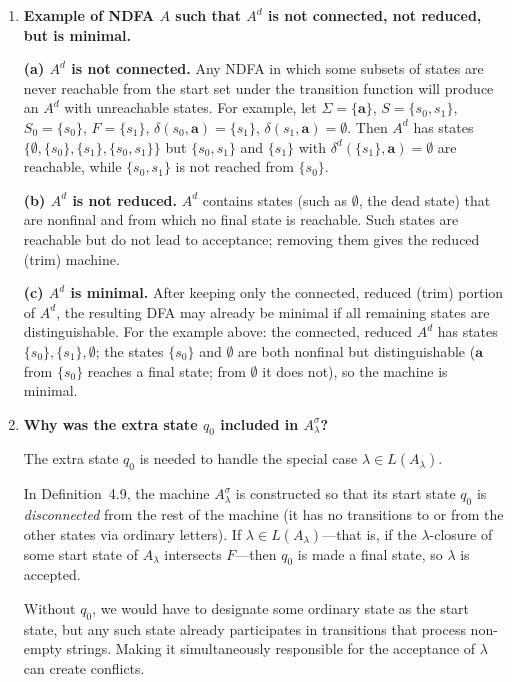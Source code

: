 \begin{enumerate}[{4.}1.]
\item \textbf{Example of NDFA $A$ such that $A^d$ is not connected, not reduced,
but is minimal.}

\textbf{(a) $A^d$ is not connected.}  Any NDFA in which some subsets of states
are never reachable from the start set under the transition function will
produce an $A^d$ with unreachable states.  For example, let
$\Sigma=\{\pmb{a}\}$, $S=\{s_0,s_1\}$, $S_0=\{s_0\}$, $F=\{s_1\}$,
$\delta(s_0,\pmb{a})=\{s_1\}$, $\delta(s_1,\pmb{a})=\emptyset$.
Then $A^d$ has states $\{\emptyset,\{s_0\},\{s_1\},\{s_0,s_1\}\}$ but
$\{s_0,s_1\}$ and $\{s_1\}$ with $\delta^d(\{s_1\},\pmb{a})=\emptyset$ are
reachable, while $\{s_0,s_1\}$ is not reached from $\{s_0\}$.

\textbf{(b) $A^d$ is not reduced.}  $A^d$ contains states (such as
$\emptyset$, the dead state) that are nonfinal and from which no final state is
reachable.  Such states are reachable but do not lead to acceptance; removing
them gives the reduced (trim) machine.

\textbf{(c) $A^d$ is minimal.}  After keeping only the connected, reduced
(trim) portion of $A^d$, the resulting DFA may already be minimal if all
remaining states are distinguishable.  For the example above: the connected,
reduced $A^d$ has states $\{s_0\},\{s_1\},\emptyset$; the states $\{s_0\}$ and
$\emptyset$ are both nonfinal but distinguishable ($\pmb{a}$ from $\{s_0\}$
reaches a final state; from $\emptyset$ it does not), so the machine is minimal.

\item \textbf{Why was the extra state $q_0$ included in $A^{\sigma}_\lambda$?}

The extra state $q_0$ is needed to handle the special case $\lambda\in L(A_\lambda)$.

In Definition~4.9, the machine $A^{\sigma}_\lambda$ is constructed so that
its start state $q_0$ is \emph{disconnected} from the rest of the machine
(it has no transitions to or from the other states via ordinary letters).
If $\lambda\in L(A_\lambda)$---that is, if the $\lambda$-closure of some
start state of $A_\lambda$ intersects $F$---then $q_0$ is made a final state,
so $\lambda$ is accepted.

Without $q_0$, we would have to designate some ordinary state as the start
state, but any such state already participates in transitions that process
non-empty strings.  Making it simultaneously responsible for the acceptance of
$\lambda$ can create conflicts.


\end{enumerate}
